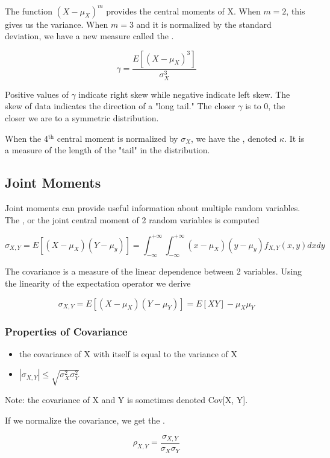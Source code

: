 The function $(X - \mu_X)^m$ provides the central moments of X. When $m = 2$, this gives us the variance. When $m = 3$ and it is normalized by the standard deviation, we have a new measure called the .

\[
    \gamma = \frac{E[(X-\mu_X)^3]}{\sigma_X^3}  
\]

Positive values of $\gamma$ indicate right skew while negative indicate left skew. The skew of data indicates the direction of a "long tail." The closer $\gamma$ is to 0, the closer we are to a symmetric distribution.

When the 4$^\text{th}$ central moment is normalized by $\sigma_X$, we have the , denoted $\kappa$. It is a measure of the length of the "tail" in the distribution.

\subsection*{Joint Moments}
Joint moments can provide useful information about multiple random variables. The , or the joint central moment of 2 random variables is computed

\[
    \sigma_{X, Y} = E[(X - \mu_X)(Y - \mu_y)] = \int_{-\infty}^{+\infty}\int_{-\infty}^{+\infty} (x - \mu_X)(y - \mu_y)f_{X, Y}(x, y)dxdy
\]

The covariance is a measure of the linear dependence between 2 variables. Using the linearity of the expectation operator we derive

\[
    \sigma_{X, Y} = E[(X - \mu_X)(Y - \mu_Y)] = E[XY] - \mu_X\mu_Y
\]

\subsubsection*{Properties of Covariance}
\begin{itemize}
    \item the covariance of X with itself is equal to the variance of X
    \item $|\sigma_{X,Y}| \le \sqrt{\sigma_X^2\sigma_Y^2}$
\end{itemize}

Note: the covariance of X and Y is sometimes denoted Cov[X, Y].

If we normalize the covariance, we get the .

\[
    \rho_{X,Y} = \frac{\sigma_{X, Y}}{\sigma_X \sigma_Y}
\]

